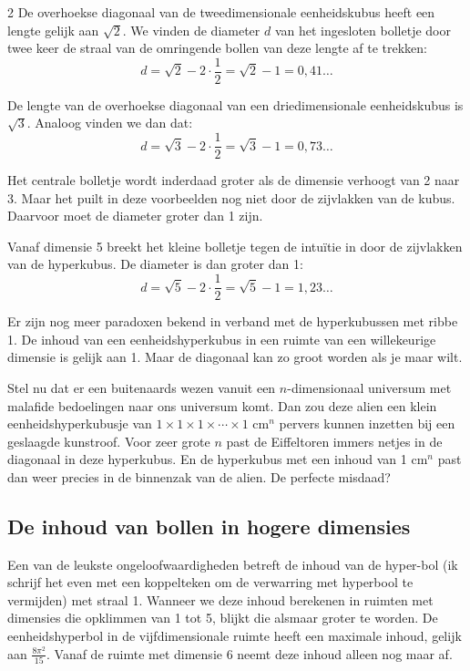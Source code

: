 \begin{multicols}{2}
De overhoekse diagonaal van de tweedimensionale eenheidskubus heeft een lengte gelijk aan $\sqrt{2}$. We vinden de diameter $d$ van het ingesloten bolletje door twee keer de straal van de omringende bollen van deze lengte af te trekken:
\[d= \sqrt{2} -2 \cdot \frac{1}{2}= \sqrt{2}-1=0,41 \dots\]

De lengte van de overhoekse diagonaal van een driedimensionale eenheidskubus is $\sqrt{3}$. Analoog vinden we dan dat:
\[d= \sqrt{3} -2 \cdot \frac{1}{2}= \sqrt{3}-1=0,73 \dots\]

Het centrale bolletje wordt inderdaad groter als de dimensie verhoogt van 2 naar 3. Maar het puilt in deze voorbeelden nog niet door de zijvlakken van de kubus. Daarvoor moet de diameter groter dan 1 zijn.

Vanaf dimensie 5 breekt het kleine bolletje tegen de intuïtie in door de zijvlakken van de hyperkubus. De diameter is dan groter dan 1:
\[d= \sqrt{5} -2 \cdot \frac{1}{2}= \sqrt{5}-1=1,23 \dots\]

Er zijn nog meer paradoxen bekend in verband met de hyperkubussen met ribbe 1. De inhoud van een eenheidshyperkubus in een ruimte van een willekeurige dimensie is gelijk aan 1. Maar de diagonaal kan zo groot worden als je maar wilt.

Stel nu dat er een buitenaards wezen vanuit een $n$-dimensionaal universum met malafide bedoelingen naar ons universum komt. Dan zou deze alien een klein eenheidshyperkubusje van $1 \times 1 \times 1 \times \cdots \times 1$ cm$^n$ pervers kunnen inzetten bij een geslaagde kunstroof. Voor zeer grote $n$ past de Eiffeltoren immers netjes in de diagonaal in deze hyperkubus. En de hyperkubus met een inhoud van 1 cm$^n$ past dan weer precies in de binnenzak van de alien. De perfecte misdaad?


\subsection{De inhoud van bollen in hogere dimensies}

Een van de leukste ongeloofwaardigheden betreft de inhoud van de hyper-bol (ik schrijf het even met een koppelteken om de verwarring met hyperbool te vermijden) met straal 1. Wanneer we deze inhoud berekenen in ruimten met dimensies die opklimmen van 1 tot 5, blijkt die alsmaar groter te worden. De eenheidshyperbol in de vijfdimensionale ruimte heeft een maximale inhoud, gelijk aan $\frac{8 \pi^2}{15}$. Vanaf de ruimte met dimensie 6 neemt deze inhoud alleen nog maar af. 


\end{multicols}
